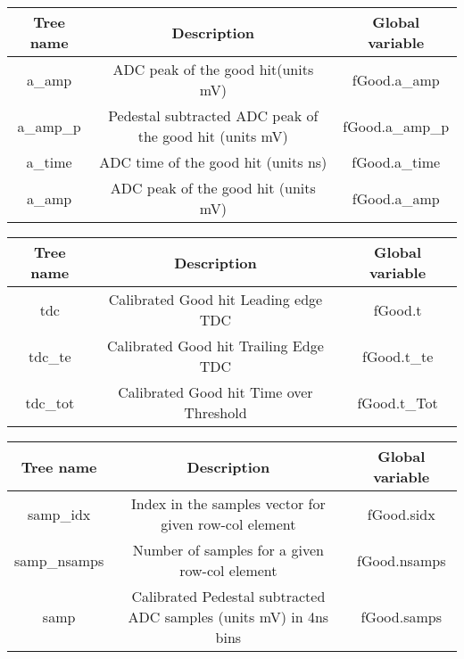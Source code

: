 \documentclass[11pt]{article}
\begin{document}
\begin{center}
\begin{tabular}{|c|c|c|}
	\hline 
Tree name	& Description &  Global variable\\ 
	\hline 
a\_amp	& ADC peak of the good hit(units mV)  &fGood.a\_amp  \\ 
\hline 
a\_amp\_p	& Pedestal subtracted ADC peak of the good hit (units mV) & fGood.a\_amp\_p \\ 
\hline 
a\_time	& ADC time of the good hit  (units ns)  &fGood.a\_time  \\ 
\hline 
a\_amp	& ADC peak of the good hit (units mV)  &fGood.a\_amp  \\ 
\hline 
\end{tabular} 
\end{center}


\begin{center}
\begin{tabular}{|c|c|c|}
	\hline 
	Tree name	& Description &  Global variable\\ 
	\hline 
	tdc 	& Calibrated Good hit Leading edge TDC  &fGood.t  \\ 
\hline 
	tdc\_te 	& Calibrated  Good hit Trailing Edge TDC  &fGood.t\_te  \\ 
\hline 
	tdc\_tot 	& Calibrated  Good hit Time over Threshold  &fGood.t\_Tot  \\ 
\hline 
\end{tabular} 
\end{center}


\begin{center}
	\begin{tabular}{|c|c|c|}
	\hline 
	Tree name	& Description &  Global variable\\ 
	\hline 
	samp\_idx 	& Index in the samples vector for given row-col element &fGood.sidx  \\ 
	\hline 
	samp\_nsamps	& Number of samples for a given row-col element &fGood.nsamps  \\ 
\hline 
	samp 	& Calibrated Pedestal subtracted ADC samples (units mV) in 4ns bins &fGood.samps  \\ 
\hline 
\end{tabular} 
\end{center}

\end{document}
